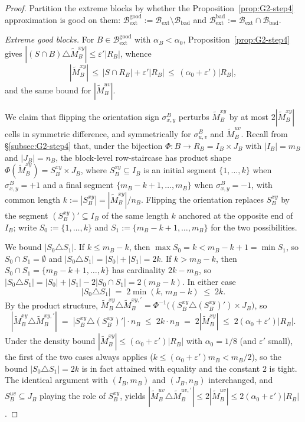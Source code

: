 \begin{proof}
Partition the extreme blocks by whether the Proposition~\ref{prop:G2-step4}
approximation is good on them:
$\mathcal B_{\mathrm{ext}}^{\mathrm{good}}:=\mathcal B_{\mathrm{ext}}\setminus\mathcal B_{\mathrm{bad}}$
and
$\mathcal B_{\mathrm{ext}}^{\mathrm{bad}}:=\mathcal B_{\mathrm{ext}}\cap\mathcal B_{\mathrm{bad}}$.

\emph{Extreme good blocks.} For $B\in\mathcal B_{\mathrm{ext}}^{\mathrm{good}}$
with $\alpha_B<\alpha_0$, Proposition~\ref{prop:G2-step4} gives
$|(S\cap B)\triangle\tilde M_B^{xy}|\le\varepsilon'|R_B|$, whence
\[
|\tilde M_B^{xy}|\,\le\,|S\cap R_B|+\varepsilon'|R_B|\,\le\,(\alpha_0+\varepsilon')|R_B|,
\]
and the same bound for $|\tilde M_B^{uv}|$.

We claim that flipping the orientation sign $\sigma_{x,y}^B$ perturbs
$\tilde M_B^{xy}$ by at most $2|\tilde M_B^{xy}|$ cells in symmetric
difference, and symmetrically for $\sigma_{u,v}^B$ and $\tilde M_B^{uv}$.
Recall from \S\ref{subsec:G2-step4} that, under the bijection
$\Phi\colon B\to R_B=I_B\times J_B$ with $|I_B|=m_B$ and $|J_B|=n_B$,
the block-level row-staircase has product shape
$\Phi(\tilde M_B^{xy})=S_B^{xy}\times J_B$, where $S_B^{xy}\subseteq I_B$
is an initial segment $\{1,\dots,k\}$ when $\sigma_{x,y}^B=+1$ and a
final segment $\{m_B-k+1,\dots,m_B\}$ when $\sigma_{x,y}^B=-1$, with
common length $k:=|S_B^{xy}|=|\tilde M_B^{xy}|/n_B$. Flipping the
orientation replaces $S_B^{xy}$ by the segment $(S_B^{xy})'\subseteq I_B$
of the same length $k$ anchored at the opposite end of $I_B$; write
$S_0:=\{1,\dots,k\}$ and $S_1:=\{m_B-k+1,\dots,m_B\}$ for the two
possibilities.

We bound $|S_0\triangle S_1|$. If $k\le m_B-k$, then
$\max S_0=k<m_B-k+1=\min S_1$, so $S_0\cap S_1=\emptyset$ and
$|S_0\triangle S_1|=|S_0|+|S_1|=2k$. If $k>m_B-k$, then
$S_0\cap S_1=\{m_B-k+1,\dots,k\}$ has cardinality $2k-m_B$, so
$|S_0\triangle S_1|=|S_0|+|S_1|-2|S_0\cap S_1|=2(m_B-k)$. In either
case
\[
|S_0\triangle S_1|\;=\;2\min(k,\,m_B-k)\;\le\;2k.
\]
By the product structure,
$\tilde M_B^{xy}\triangle\tilde M_B^{xy,\prime}
=\Phi^{-1}\!\bigl((S_B^{xy}\triangle(S_B^{xy})')\times J_B\bigr)$, so
\[
|\tilde M_B^{xy}\triangle\tilde M_B^{xy,\prime}|
\;=\;|S_B^{xy}\triangle(S_B^{xy})'|\cdot n_B
\;\le\;2k\cdot n_B
\;=\;2|\tilde M_B^{xy}|
\;\le\;2(\alpha_0+\varepsilon')|R_B|.
\]
Under the density bound $|\tilde M_B^{xy}|\le(\alpha_0+\varepsilon')|R_B|$
with $\alpha_0=1/8$ (and $\varepsilon'$ small), the first of the two
cases always applies ($k\le(\alpha_0+\varepsilon')m_B<m_B/2$), so the
bound $|S_0\triangle S_1|=2k$ is in fact attained with equality and
the constant $2$ is tight. The identical argument with $(I_B,m_B)$
and $(J_B,n_B)$ interchanged, and $S_B^{uv}\subseteq J_B$ playing the
role of $S_B^{xy}$, yields
$|\tilde M_B^{uv}\triangle\tilde M_B^{uv,\prime}|\le 2|\tilde M_B^{uv}|
\le 2(\alpha_0+\varepsilon')|R_B|$.


\end{proof}
